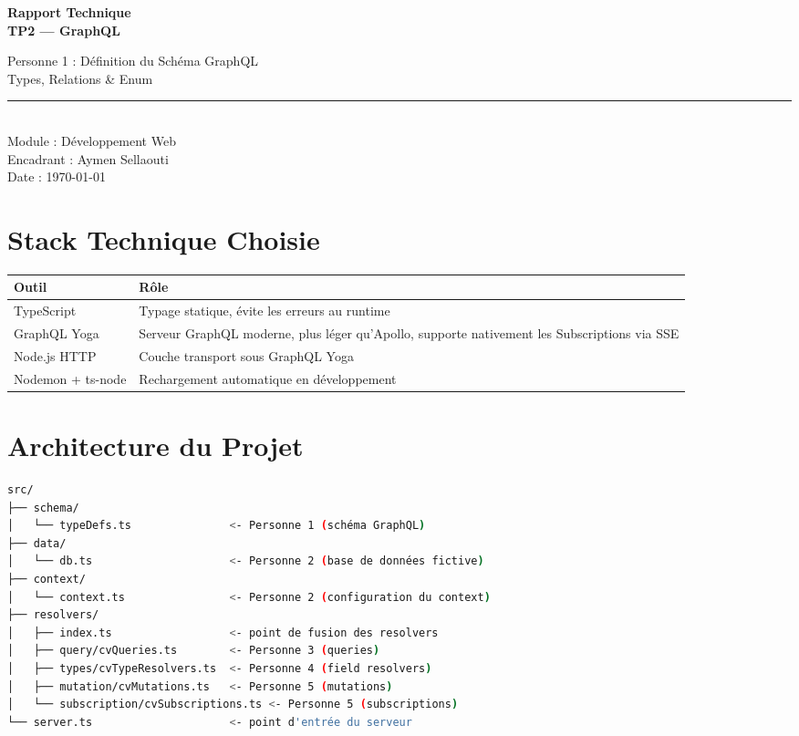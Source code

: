 \documentclass[12pt,a4paper]{article}
\begin{document}
\begin{titlepage}
  \centering
  \vspace*{3cm}
  {\Huge\bfseries Rapport Technique\\[0.4em]
  \color{graphqlpink} TP2 --- GraphQL\par}
  \vspace{1.5cm}
  {\large Personne 1 : Définition du Schéma GraphQL\\
  Types, Relations \& Enum\par}
  \vspace{1cm}
  \rule{0.6\textwidth}{0.4pt}\\[1em]
  {\normalsize
    Module : Développement Web\\
    Encadrant : Aymen Sellaouti\\
    Date : \today
  }
  \vfill
\end{titlepage}

\tableofcontents
\newpage

\section{Stack Technique Choisie}

\begin{center}
\begin{tabular}{@{}lp{10cm}@{}}
\toprule
\textbf{Outil} & \textbf{Rôle} \\
\midrule
TypeScript    & Typage statique, évite les erreurs au runtime \\
GraphQL Yoga  & Serveur GraphQL moderne, plus léger qu'Apollo, supporte nativement les Subscriptions via SSE \\
Node.js HTTP  & Couche transport sous GraphQL Yoga \\
Nodemon + ts-node & Rechargement automatique en développement \\
\bottomrule
\end{tabular}
\end{center}

\section{Architecture du Projet}

\begin{lstlisting}[language=bash, numbers=none, caption={Structure des dossiers}]
src/
├── schema/
│   └── typeDefs.ts               <- Personne 1 (schéma GraphQL)
├── data/
│   └── db.ts                     <- Personne 2 (base de données fictive)
├── context/
│   └── context.ts                <- Personne 2 (configuration du context)
├── resolvers/
│   ├── index.ts                  <- point de fusion des resolvers
│   ├── query/cvQueries.ts        <- Personne 3 (queries)
│   ├── types/cvTypeResolvers.ts  <- Personne 4 (field resolvers)
│   ├── mutation/cvMutations.ts   <- Personne 5 (mutations)
│   └── subscription/cvSubscriptions.ts <- Personne 5 (subscriptions)
└── server.ts                     <- point d'entrée du serveur
\end{lstlisting}
\end{document}
